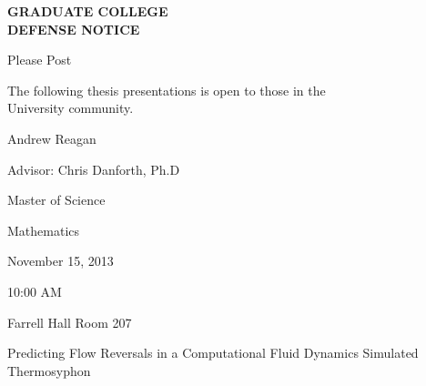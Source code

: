 \documentclass[12pt]{amsart}
\begin{document}

\begin{center}
{\Large {\bf GRADUATE COLLEGE\\ \vspace{5px}
DEFENSE NOTICE}}

\vspace{20px}
{\large
Please Post\\
\vspace{20px}

The following thesis presentations is open to those in the \\
University community.
\vspace{35px}

Andrew Reagan\\
\vspace{20px}

Advisor: Chris Danforth, Ph.D\\
\vspace{20px}

Master of Science\\
\vspace{20px}

Mathematics\\
\vspace{20px}

November 15, 2013\\
\vspace{20px}

10:00 AM\\
\vspace{20px}

Farrell Hall Room 207\\
\vspace{20px}

Predicting Flow Reversals in a Computational Fluid Dynamics Simulated Thermosyphon}

\end{center}
\end{document}
